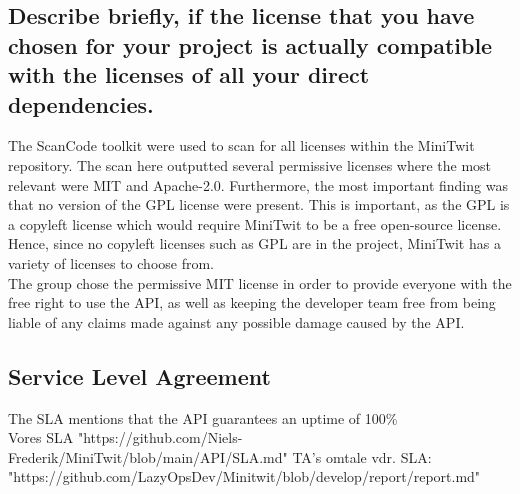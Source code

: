 \subsection{Describe briefly, if the license that you have chosen for your project is actually compatible with the licenses of all your direct dependencies.}
The ScanCode toolkit\cite{scancode} were used to scan for all licenses within the MiniTwit repository. The scan here outputted several permissive licenses where the most relevant were MIT and Apache-2.0. Furthermore, the most important finding was that no version of the GPL license were present. This is important, as the GPL is a copyleft license which would require MiniTwit to be a free open-source license\cite{gpl}. Hence, since no copyleft licenses such as GPL are in the project, MiniTwit has a variety of licenses to choose from.\\
The group chose the permissive MIT license in order to provide everyone with the free right to use the API, as well as keeping the developer team free from being liable of any claims made against any possible damage caused by the API.

\subsection{Service Level Agreement}
The SLA mentions that the API guarantees an uptime of 100\%\\
Vores SLA "https://github.com/Niels-Frederik/MiniTwit/blob/main/API/SLA.md"
TA's omtale vdr. SLA: "https://github.com/LazyOpsDev/Minitwit/blob/develop/report/report.md"
